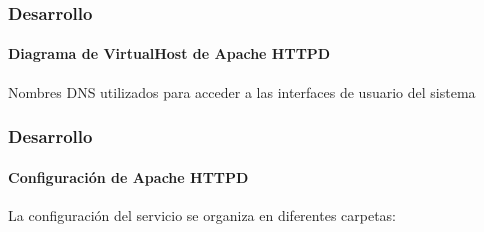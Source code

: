 \documentclass{beamer}
\begin{document}
%
%
%
%
%

\begin{frame}
\frametitle{Desarrollo}
\framesubtitle{Diagrama de VirtualHost de Apache \textup{HTTPD}}

Nombres \textup{DNS} utilizados para acceder a las interfaces de usuario del sistema

\vspace{2em}

\centering
 {
  
 }

\end{frame}


\begin{frame}
\frametitle{Desarrollo}
\framesubtitle{Configuraci\'{o}n de Apache \textup{HTTPD}}

La configuraci\'{o}n del servicio se organiza en diferentes carpetas:

\vspace{2em}

\centering
 {
  
 }

\end{frame}
\end{document}
